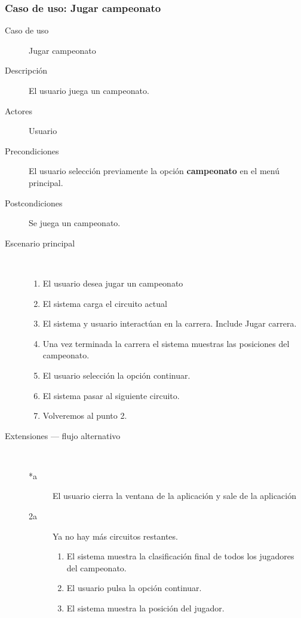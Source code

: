 \subsubsection{Caso de uso: Jugar campeonato}

\begin{description}
    \item[Caso de uso] Jugar campeonato
    \item[Descripción] El usuario juega un campeonato.
    \item[Actores] Usuario
    \item[Precondiciones] El usuario selección previamente la opción \textbf{campeonato} en el menú principal.
    \item[Postcondiciones] Se juega un campeonato.
    
    \item[Escenario principal] $\quad$
        \begin{enumerate}
            \item El usuario desea jugar un campeonato
            \item El sistema carga el circuito actual
            \item El sistema y usuario interactúan en la carrera. Include Jugar carrera.
            \item Una vez terminada la carrera el sistema muestras las posiciones del campeonato.
            \item El usuario selección la opción continuar.
            \item El sistema pasar al siguiente circuito.
            \item Volveremos al punto 2.
        \end{enumerate}
    \item[Extensiones --- flujo alternativo] $\quad$
        \begin{description}
            \item[*a ] El usuario cierra la ventana de la aplicación y sale de la aplicación
            
            \item[2a ] Ya no hay más circuitos restantes.
                \begin{enumerate}
                    \item El sistema muestra la clasificación final de todos los jugadores del campeonato.
                    \item El usuario pulsa la opción continuar.
                    \item El sistema muestra la posición del jugador.
                \end{enumerate}
        \end{description}
\end{description}

